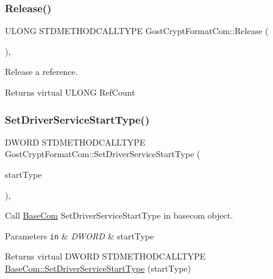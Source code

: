 \subsubsection{\texorpdfstring{Release()}{Release()}}
{\footnotesize\ttfamily U\+L\+O\+NG S\+T\+D\+M\+E\+T\+H\+O\+D\+C\+A\+L\+L\+T\+Y\+PE Gost\+Crypt\+Format\+Com\+::\+Release (\begin{DoxyParamCaption}{ }\end{DoxyParamCaption})\hspace{0.3cm}{\ttfamily [inline]}, {\ttfamily [virtual]}}



Release a reference. 

\begin{DoxyReturn}{Returns}
virtual U\+L\+O\+NG Ref\+Count 
\end{DoxyReturn}
\mbox{\label{class_gost_crypt_format_com_a310342c02b8e6dd3df34b3806198de83}} 
\subsubsection{\texorpdfstring{Set\+Driver\+Service\+Start\+Type()}{SetDriverServiceStartType()}}
{\footnotesize\ttfamily D\+W\+O\+RD S\+T\+D\+M\+E\+T\+H\+O\+D\+C\+A\+L\+L\+T\+Y\+PE Gost\+Crypt\+Format\+Com\+::\+Set\+Driver\+Service\+Start\+Type (\begin{DoxyParamCaption}\item[{D\+W\+O\+RD}]{start\+Type }\end{DoxyParamCaption})\hspace{0.3cm}{\ttfamily [inline]}, {\ttfamily [virtual]}}



Call \hyperlink{class_base_com}{Base\+Com} Set\+Driver\+Service\+Start\+Type in basecom object. 


\begin{DoxyParams}[1]{Parameters}
\mbox{\tt in}  & {\em D\+W\+O\+RD} & start\+Type \\
\hline
\end{DoxyParams}
\begin{DoxyReturn}{Returns}
virtual D\+W\+O\+RD S\+T\+D\+M\+E\+T\+H\+O\+D\+C\+A\+L\+L\+T\+Y\+PE \hyperlink{class_base_com_a4c4f6cb8a6560a8a44fa7053d1747ea7}{Base\+Com\+::\+Set\+Driver\+Service\+Start\+Type} (start\+Type) 
\end{DoxyReturn}


